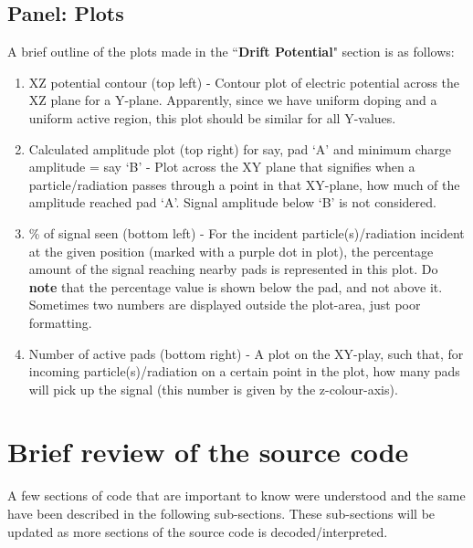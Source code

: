 \documentclass[11pt]{article}
\begin{document}
\subsection{Panel: Plots}
A brief outline of the plots made in the ``\textbf{Drift Potential}" section is as follows:
\begin{enumerate}
    \item XZ potential contour (top left) - Contour plot of electric potential across the XZ plane for a Y-plane. Apparently, since we have uniform doping and a uniform active region, this plot should be similar for all Y-values.
    \item Calculated amplitude plot (top right) for say, pad `A' and minimum charge amplitude = say `B' - Plot across the XY plane that signifies when a particle/radiation passes through a point in that XY-plane, how much of the amplitude reached pad `A'. Signal amplitude below `B' is not considered.
    \item \% of signal seen (bottom left) - For the incident particle(s)/radiation incident at the given position (marked with a purple dot in plot), the percentage amount of the signal reaching nearby pads is represented in this plot. Do \textbf{note} that the percentage value is shown below the pad, and not above it. Sometimes two numbers are displayed outside the plot-area, just poor formatting.
    \item Number of active pads (bottom right) - A plot on the XY-play, such that, for incoming particle(s)/radiation on a certain point in the plot, how many pads will pick up the signal (this number is given by the z-colour-axis).
\end{enumerate}

\section{Brief review of the source code}

A few sections of code that are important to know were understood and the same have been described in the following sub-sections. These sub-sections will be updated as more sections of the source code is decoded/interpreted.
\end{document}
